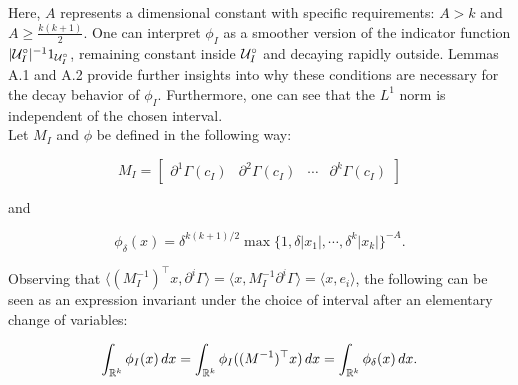 Here, \( A \) represents a dimensional constant with specific requirements: \( A > k \) and \( A \geqslant \frac{k(k+1)}{2} \). One can interpret \( \phi_{I} \) as a smoother version of the indicator function \( |\mathcal{U}^\circ_{I}|^{-1}\mathrm{1}_{\mathcal{U}^\circ_{I}} \), remaining constant inside \( \mathcal{U}^\circ_{I} \) and decaying rapidly outside. Lemmas A.1 and A.2 provide further insights into why these conditions are necessary for the decay behavior of \( \phi_{I} \). Furthermore, one can see that the $L^1$ norm is independent of the chosen interval.\\

Let \( M_{I} \) and \( \phi \) be defined in the following way:

\begin{equation}\label{eq:change_box}
M_{I} = \left[ \begin{array}{c|c|c|c}
\partial^1 \Gamma(c_{I}) & \partial^2 \Gamma(c_{I}) & \cdots & \partial^k \Gamma(c_{I})
\end{array} \right]
\end{equation}

and 

\begin{equation}\label{eq:function_change_box}
\phi_{\delta}(x)= \delta^{k(k+1)/2} \max \{1, \delta |x_1|, \cdots, \delta^{k} |x_k|\}^{-A}.
\end{equation}

Observing that \(\langle (M_{I}^{-1})^{\top} x, \partial^i \Gamma \rangle = \langle x, M_{I}^{-1} \partial^i \Gamma \rangle = \langle x, e_i \rangle\), the following can be seen as an expression invariant under the choice of interval after an elementary change of variables:

\[
\int_{\mathbb{R}^k} \phi_{I}(x)\, dx = \int_{\mathbb{R}^k} \phi_{I}((M^{-1})^{\top} x)\, dx = \int_{\mathbb{R}^k} \phi_{\delta}(x)\, dx.
\]

